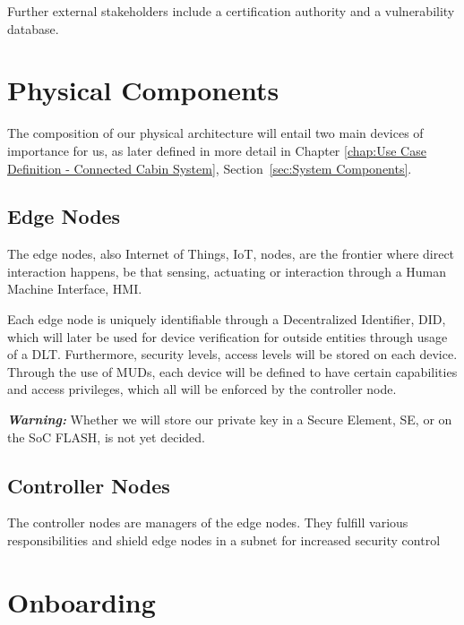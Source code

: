 Further external stakeholders include a certification authority and a vulnerability database.

\section{Physical Components} %
\label{sec:Physical Components}

The composition of our physical architecture will entail two main devices of importance for us, as later defined in more
detail in Chapter \ref{chap:Use Case Definition - Connected Cabin System}, Section~\ref{sec:System Components}.


\subsection{Edge Nodes} %
\label{sec:Edge Nodes}
The edge nodes, also Internet of Things, IoT, nodes, are the frontier where direct interaction happens, be that sensing,
actuating or interaction through a Human Machine Interface, HMI.

Each edge node is uniquely identifiable through a Decentralized Identifier, DID, which will later be used for device
verification for outside entities through usage of a DLT. Furthermore, security levels, access levels will be stored on
each device. Through the use of MUDs, each device will be defined to have certain capabilities and access privileges,
which all will be enforced by the controller node.

\textbf{\textit{Warning:}} Whether we will store our private key in a Secure Element, SE, or on the SoC FLASH, is not yet decided.

\subsection{Controller Nodes} %
\label{sub:Controller Nodes}
The controller nodes are managers of the edge nodes. They fulfill various responsibilities and shield edge nodes in a
subnet for increased security control


\section{Onboarding} %

